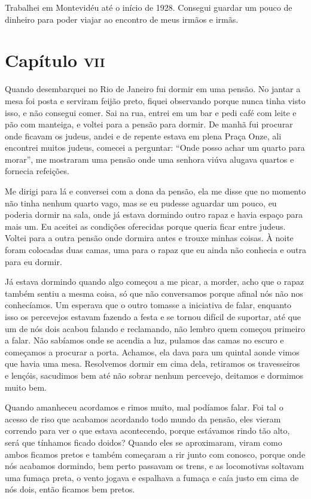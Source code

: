 Trabalhei em Montevidéu até o início de 1928. Consegui guardar um pouco
de dinheiro para poder viajar ao encontro de meus irmãos e irmãs.

\chapter{Capítulo \textsc{vii}}

Quando desembarquei no Rio de Janeiro fui dormir em uma pensão. No
jantar a mesa foi posta e serviram feijão preto, fiquei observando
porque nunca tinha visto isso, e não consegui comer. Sai na rua, entrei
em um bar e pedi café com leite e pão com manteiga, e voltei para a
pensão para dormir. De manhã fui procurar onde ficavam os judeus, andei
e de repente estava em plena Praça Onze, ali encontrei muitos judeus,
comecei a perguntar: ``Onde posso achar um quarto para morar'', me
mostraram uma pensão onde uma senhora viúva alugava quartos e fornecia
refeições.

Me dirigi para lá e conversei com a dona da pensão, ela me disse que no
momento não tinha nenhum quarto vago, mas se eu pudesse aguardar um
pouco, eu poderia dormir na sala, onde já estava dormindo outro rapaz e
havia espaço para mais um. Eu aceitei as condições oferecidas porque
queria ficar entre judeus. Voltei para a outra pensão onde dormira antes
e trouxe minhas coisas. À noite foram colocadas duas camas, uma para o
rapaz que eu ainda não conhecia e outra para eu dormir.

Já estava dormindo quando algo começou a me picar, a morder, acho que o
rapaz também sentiu a mesma coisa, só que não conversamos porque afinal
nós não nos conhecíamos. Um esperava que o outro tomasse a iniciativa de
falar, enquanto isso os percevejos estavam fazendo a festa e se tornou
difícil de suportar, até que um de nós dois acabou falando e reclamando,
não lembro quem começou primeiro a falar. Não sabíamos onde se acendia a
luz, pulamos das camas no escuro e começamos a procurar a porta.
Achamos, ela dava para um quintal aonde vimos que havia uma mesa.
Resolvemos dormir em cima dela, retiramos os travesseiros e lençóis,
sacudimos bem até não sobrar nenhum percevejo, deitamos e dormimos muito
bem.

Quando amanheceu acordamos e rimos muito, mal podíamos falar. Foi tal o
acesso de riso que acabamos acordando todo mundo da pensão, eles vieram
correndo para ver o que estava acontecendo, porque estávamos rindo tão
alto, será que tínhamos ficado doidos? Quando eles se aproximaram, viram
como ambos ficamos pretos e também começaram a rir junto com conosco,
porque onde nós acabamos dormindo, bem perto passavam os trens, e as
locomotivas soltavam uma fumaça preta, o vento jogava e espalhava a
fumaça e caía justo em cima de nós dois, então ficamos bem pretos.

